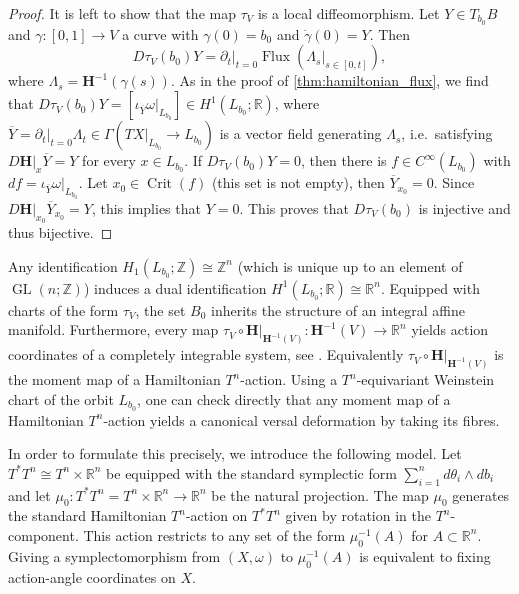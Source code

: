 \documentclass[12pt,a4paper,draft]{scrartcl}
\DeclareMathOperator{\GL}{GL}
\DeclareMathOperator{\Flux}{Flux}
\DeclareMathOperator{\Crit}{Crit}
\begin{document}
\begin{proof}
    It is left to show that the map $τ_V$ is a local diffeomorphism.
    Let $Y \in T_{b_0}B$ and $\gamma \colon [0,1] \rightarrow V$ a curve with $\gamma(0) = b_0$ and $\dot{\gamma}(0) = Y$.
    Then 
    \[
        \label{eq:Dphi}
        Dτ_V(b_0) Y = \partial_t\vert_{t = 0} \Flux (\Lambda_s\vert_{s \in [0,t]}),
    \]
    where $\Lambda_s = \mathbf{H}^{-1}(\gamma(s))$.
    As in the proof of \cref{thm:hamiltonian_flux}, we find that $Dτ_V(b_0) Y = [\iota_{\overline{Y}}\omega \vert_{L_{b_0}}] \in H^1(L_{b_0};\mathbb{R})$, where $\overline{Y} = \partial_t \vert_{t=0} \Lambda_t \in \Gamma(TX\vert_{L_{b_0}} \rightarrow L_{b_0})$ is a vector field generating $\Lambda_s$, i.e.\ satisfying $D\mathbf{H}\vert_x \overline{Y} = Y$ for every $x \in L_{b_0}$.
    If $Dτ_V(b_0) Y = 0$, then there is $f \in C^{\infty}(L_{b_0})$ with $df = \iota_{\overline{Y}}\omega \vert_{L_{b_0}}$.
    Let $x_0 \in \Crit(f)$ (this set is not empty), then $\overline{Y}_{x_0} = 0$.
    Since $D\mathbf{H} \vert_{x_0} \overline{Y}_{x_0} = Y$, this implies that $Y = 0$.
    This proves that $Dτ_V(b_0)$ is injective and thus bijective. 
\end{proof}

Any identification $H_1(L_{b_0};\mathbb{Z}) \cong \mathbb{Z}^n$ (which is unique up to an element of $\GL(n;ℤ)$) induces a dual identification $H^1(L_{b_0};\mathbb{R}) \cong \mathbb{R}^n$.
Equipped with charts of the form $τ_V$, the set $B_0$ inherits the structure of an integral affine manifold.
Furthermore, every map $τ_V \circ \mathbf{H}\vert_{\mathbf{H}^{-1}(V)} \colon \mathbf{H}^{-1}(V) \rightarrow \mathbb{R}^n$ yields action coordinates of a completely integrable system, see \cite[Lemma 2.15]{evans2021atfs}.
Equivalently $τ_V \circ \mathbf{H}\vert_{\mathbf{H}^{-1}(V)}$ is the moment map of a Hamiltonian $T^n$-action. Using a $T^n$-equivariant Weinstein chart of the orbit $L_{b_0}$, one can check directly that any moment map of a Hamiltonian $T^n$-action yields a canonical versal deformation by taking its fibres.

In order to formulate this precisely, we introduce the following model. Let $T^*T^n \cong T^n \times \mathbb{R}^n$ be equipped with the standard symplectic form $\sum_{i=1}^n d\theta_i \wedge db_i$ and let $\mu_0 \colon T^*T^n = T^n \times \mathbb{R}^n \rightarrow \mathbb{R}^n$ be the natural projection. The map $\mu_0$ generates the standard Hamiltonian $T^n$-action on $T^*T^n$ given by rotation in the $T^n$-component. This action restricts to any set of the form $\mu_0^{-1}(A)$ for $A \subset \mathbb{R}^n$. Giving a symplectomorphism from $(X,\omega)$ to $\mu_0^{-1}(A)$ is equivalent to fixing action-angle coordinates on $X$. 
\end{document}
